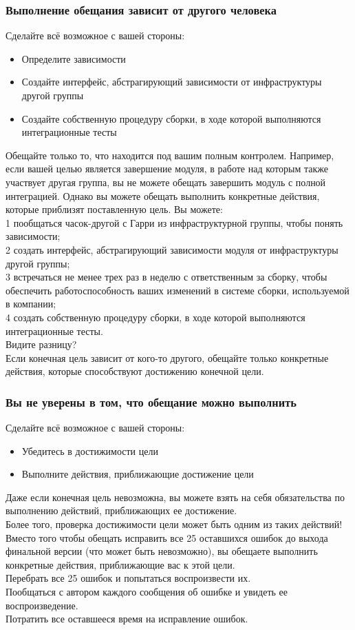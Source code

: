 \documentclass{../industrial-development}
\begin{document}
\begin{frame} \frametitle{Выполнение обещания зависит от другого человека }
Сделайте всё возможное с вашей стороны:
\begin{itemize}
	\item Определите зависимости
	\item Создайте интерфейс, абстрагирующий зависимости от инфраструктуры другой группы
	\item Создайте собственную процедуру сборки, в ходе которой выполняются интеграционные тесты
\end{itemize}
\end{frame}
\lecturenotes
Обещайте только то, что находится под вашим полным контролем. Например, если вашей целью является завершение модуля, в работе
над которым также участвует другая группа, вы не можете обещать завершить модуль с полной интеграцией. Однако вы можете обещать выполнить конкретные действия, которые приблизят поставленную цель. Вы можете:\\
1 пообщаться часок-другой с Гарри из инфраструктурной группы, чтобы понять зависимости;\\
2 создать интерфейс, абстрагирующий зависимости модуля от инфраструктуры другой группы;\\
3 встречаться не менее трех раз в неделю с ответственным за сборку, чтобы обеспечить работоспособность ваших изменений в системе сборки, используемой в компании;\\
4 создать собственную процедуру сборки, в ходе которой выполняются интеграционные тесты.\\
Видите разницу?\\
Если конечная цель зависит от кого-то другого, обещайте только конкретные действия, которые способствуют достижению конечной цели.

\begin{frame} \frametitle{Вы не уверены в том, что обещание можно выполнить}
Сделайте всё возможное с вашей стороны:
\begin{itemize}
	\item Убедитесь в достижимости цели
	\item Выполните действия, приближающие достижение цели
\end{itemize}
\end{frame}
\lecturenotes
Даже если конечная цель невозможна, вы можете взять на себя обязательства по выполнению действий, приближающих ее достижение.\\
Более того, проверка достижимости цели может быть одним из таких действий!\\
Вместо того чтобы обещать исправить все 25 оставшихся ошибок до выхода финальной версии (что может быть невозможно), вы обещаете выполнить конкретные действия, приближающие вас к этой цели.\\
Перебрать все 25 ошибок и попытаться воспроизвести их.\\
Пообщаться с автором каждого сообщения об ошибке и увидеть ее воспроизведение.\\
Потратить все оставшееся время на исправление ошибок.
\end{document}
